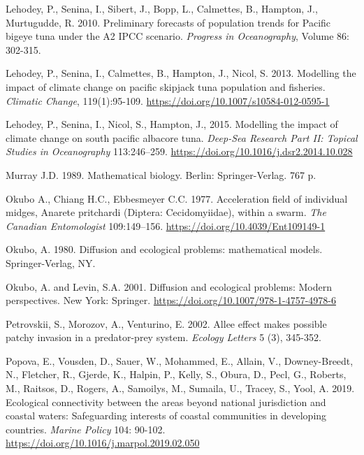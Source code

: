 \begin{thebibliography}{}
 Lehodey, P., Senina, I., Sibert, J., Bopp, L., Calmettes, B., Hampton, J., Murtugudde, R. 2010. Preliminary forecasts of population trends for Pacific bigeye tuna under the A2 IPCC scenario. \textit{Progress in Oceanography}, Volume 86: 302-315.

 Lehodey, P., Senina, I., Calmettes, B., Hampton, J., Nicol, S. 2013. Modelling the impact of climate change on pacific skipjack tuna population and fisheries. \textit{Climatic Change}, 119(1):95-109. \url{https://doi.org/10.1007/s10584-012-0595-1}

 Lehodey, P., Senina, I., Nicol, S., Hampton, J., 2015. Modelling the impact of climate change on south pacific albacore tuna. \textit{Deep-Sea Research Part II: Topical Studies in Oceanography} 113:246–259. \url{https://doi.org/10.1016/j.dsr2.2014.10.028}

 Murray J.D. 1989. Mathematical biology. Berlin: Springer-Verlag. 767 p.

 Okubo A., Chiang H.C., Ebbesmeyer C.C. 1977. Acceleration field of individual midges, Anarete pritchardi (Diptera: Cecidomyiidae), within a swarm. \textit{The Canadian Entomologist} 109:149–156. \url{https://doi.org/10.4039/Ent109149-1}

 Okubo, A. 1980. Diffusion and ecological problems: mathematical models. Springer-Verlag, NY.

 Okubo, A. and Levin, S.A. 2001. Diffusion and ecological problems: Modern perspectives. New York: Springer. \url{https://doi.org/10.1007/978-1-4757-4978-6}

  Petrovskii, S., Morozov, A., Venturino, E. 2002. Allee effect makes possible patchy invasion in a predator-prey system. \textit { Ecology Letters} 5 (3), 345-352. 

 Popova, E., Vousden, D., Sauer, W., Mohammed, E., Allain, V., Downey-Breedt, N., Fletcher, R., Gjerde, K., Halpin, P., Kelly, S., Obura, D., Pecl, G., Roberts, M., Raitsos, D., Rogers, A., Samoilys, M., Sumaila, U., Tracey, S., Yool, A. 2019. Ecological connectivity between the areas beyond national jurisdiction and coastal waters: Safeguarding interests of coastal communities in developing countries. \textit {Marine Policy} 104: 90-102. \url{https://doi.org/10.1016/j.marpol.2019.02.050}


\end{thebibliography}
